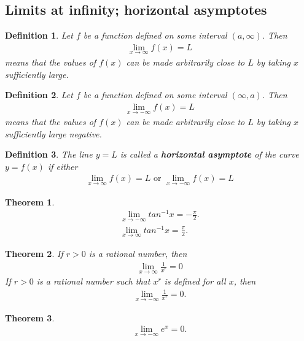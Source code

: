 \documentclass{article}
\theoremstyle{sltheorem}
\newtheorem{definition}{Definition}[section]
\newtheorem{theorem}{Theorem}[section]
\begin{document}
\subsection{Limits at infinity; horizontal asymptotes}
\begin{definition}
    Let $f$ be a function defined on some interval $(a,\infty)$. Then
    \begin{align*}
        \lim_{x\to\infty}f(x)=L
    \end{align*}
    means that the values of $f(x)$ can be made arbitrarily close to $L$ by taking $x$ sufficiently large.
\end{definition}
\begin{definition}
    Let $f$ be a function defined on some interval $(\infty, a)$. Then
    \begin{align*}
        \lim_{x\to -\infty}f(x)=L
    \end{align*}
    means that the values of $f(x)$ can be made arbitrarily close to $L$ by taking $x$ sufficiently large negative.
\end{definition}
\begin{definition}
    The line $y=L$ is called a \textbf{horizontal asymptote} of the curve $y=f(x)$ if either
    \begin{align*}
        \lim_{x\to \infty}f(x)=L \text{ or } \lim_{x\to-\infty}f(x)=L
    \end{align*}
\end{definition}
\begin{theorem}
    \begin{align*}
        \lim_{x\to-\infty}tan^{-1}x=-\frac{\pi}{2}.\\
        \lim_{x\to\infty}tan^{-1}x=\frac{\pi}{2}.
    \end{align*}
\end{theorem}
\begin{theorem}
    If $r>0$ is a rational number, then
    \begin{align*}
        \lim_{x\to\infty}\frac{1}{x^r}=0
    \end{align*}
    If $r>0$ is a rational number such that $x^r$ is defined for all $x$, then
    \begin{align*}
        \lim_{x\to-\infty}\frac{1}{x^r}=0.
    \end{align*}
\end{theorem}
\begin{theorem}
    \begin{align*}
        \lim_{x\to-\infty}e^x=0.
    \end{align*}
\end{theorem}
\end{document}
